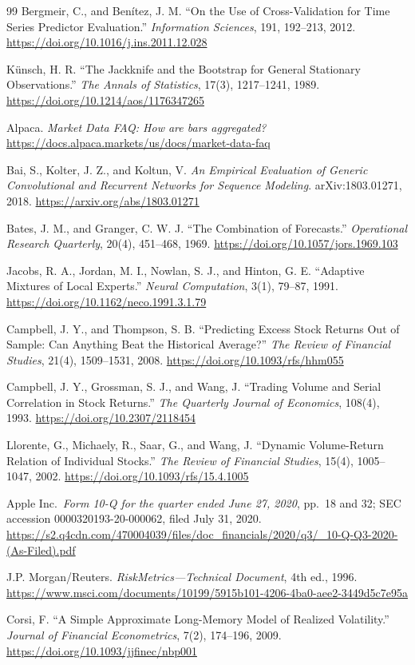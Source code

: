 \begin{thebibliography}{99}
 Bergmeir, C., and Benítez, J. M. ``On the Use of Cross-Validation for Time Series Predictor Evaluation.'' \emph{Information Sciences}, 191, 192--213, 2012. \url{https://doi.org/10.1016/j.ins.2011.12.028}

 Künsch, H. R. ``The Jackknife and the Bootstrap for General Stationary Observations.'' \emph{The Annals of Statistics}, 17(3), 1217--1241, 1989. \url{https://doi.org/10.1214/aos/1176347265}

 Alpaca. \emph{Market Data FAQ: How are bars aggregated?} \url{https://docs.alpaca.markets/us/docs/market-data-faq}

 Bai, S., Kolter, J. Z., and Koltun, V. \emph{An Empirical Evaluation of Generic Convolutional and Recurrent Networks for Sequence Modeling}. arXiv:1803.01271, 2018. \url{https://arxiv.org/abs/1803.01271}

 Bates, J. M., and Granger, C. W. J. ``The Combination of Forecasts.'' \emph{Operational Research Quarterly}, 20(4), 451--468, 1969. \url{https://doi.org/10.1057/jors.1969.103}

 Jacobs, R. A., Jordan, M. I., Nowlan, S. J., and Hinton, G. E. ``Adaptive Mixtures of Local Experts.'' \emph{Neural Computation}, 3(1), 79--87, 1991. \url{https://doi.org/10.1162/neco.1991.3.1.79}

 Campbell, J. Y., and Thompson, S. B. ``Predicting Excess Stock Returns Out of Sample: Can Anything Beat the Historical Average?'' \emph{The Review of Financial Studies}, 21(4), 1509--1531, 2008. \url{https://doi.org/10.1093/rfs/hhm055}

 Campbell, J. Y., Grossman, S. J., and Wang, J. ``Trading Volume and Serial Correlation in Stock Returns.'' \emph{The Quarterly Journal of Economics}, 108(4), 1993. \url{https://doi.org/10.2307/2118454}

 Llorente, G., Michaely, R., Saar, G., and Wang, J. ``Dynamic Volume-Return Relation of Individual Stocks.'' \emph{The Review of Financial Studies}, 15(4), 1005--1047, 2002. \url{https://doi.org/10.1093/rfs/15.4.1005}

 Apple Inc.~\emph{Form 10-Q for the quarter ended June 27, 2020}, pp.~18 and 32; SEC accession 0000320193-20-000062, filed July 31, 2020. \url{https://s2.q4cdn.com/470004039/files/doc_financials/2020/q3/_10-Q-Q3-2020-(As-Filed).pdf}

 J.P. Morgan/Reuters. \emph{RiskMetrics---Technical Document}, 4th ed., 1996. \url{https://www.msci.com/documents/10199/5915b101-4206-4ba0-aee2-3449d5c7e95a}

 Corsi, F. ``A Simple Approximate Long-Memory Model of Realized Volatility.'' \emph{Journal of Financial Econometrics}, 7(2), 174--196, 2009. \url{https://doi.org/10.1093/jjfinec/nbp001}

\end{thebibliography}
